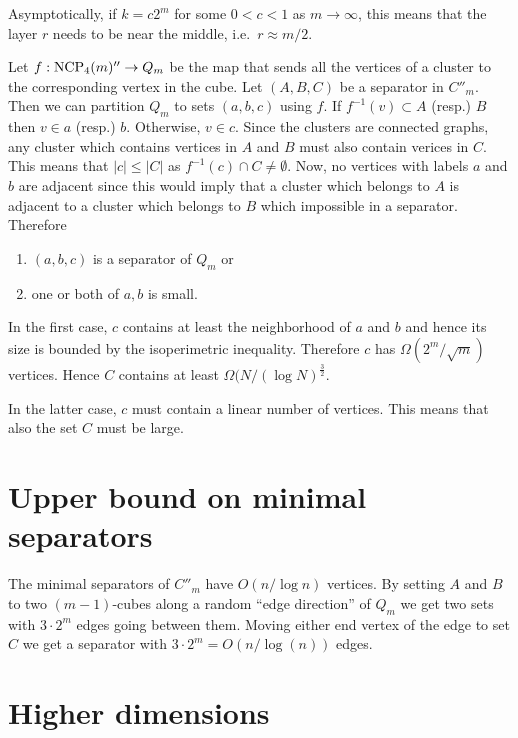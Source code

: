 Asymptotically, if $k = c2^m$ for some $0<c<1$ as $m\rightarrow \infty$, this 
means that the layer $r$ needs to be near the middle, i.e.\ $r\approx m/2$. 


Let $f: \textrm{NCP}_4(m)'' \rightarrow Q_m$ 
be the map that sends all the vertices of a cluster to the corresponding vertex 
in the cube. 
Let $(A,B,C)$ be a separator in $C''_m$. Then we can partition
$Q_m$ to sets $(a,b,c)$ using $f$. If $f^{-1}(v) \subset A$ (resp.) $B$ 
then 
$v \in a$ (resp.) $b$. Otherwise, $v \in c$. Since the clusters are connected 
graphs, any cluster which contains vertices in $A$ and $B$ must also contain 
verices in $C$. This means that $|c| \leq |C|$ as $f^{-1}(c) \cap C \neq 
\emptyset$.
Now, no vertices with labels $a$ and $b$ are adjacent since this would imply 
that a cluster which belongs to $A$ is adjacent to a cluster which belongs to 
$B$ which impossible in a separator. Therefore
\begin{enumerate}
 \item $(a,b,c)$ is a separator of $Q_m$ or
\item one or both of $a,b$ is small.
\end{enumerate}
In the first case, $c$ contains at least the neighborhood of $a$ and $b$ and 
hence its size is bounded by the isoperimetric inequality. Therefore $c$ has 
$\Omega(2^m/\sqrt{m})$ vertices. Hence $C$ contains at least $\Omega(N/(\log 
N)^{\frac{3}{2}}$.

In the latter case, $c$ must contain a linear number of vertices. This means 
that also the set $C$ must be large.  



\section{Upper bound on minimal separators}

The minimal separators of $C''_m$ have $O(n/\log n)$ vertices. By setting $A$ 
and $B$ to two $(m-1)$-cubes along a random ``edge direction'' of $Q_m$ we get 
two sets with $3\cdot 2^m$ edges going between them. Moving either end vertex 
of the edge to set $C$ we get a separator with $3\cdot 2^m = O(n/\log(n))$ 
edges.

\section{Higher dimensions}

